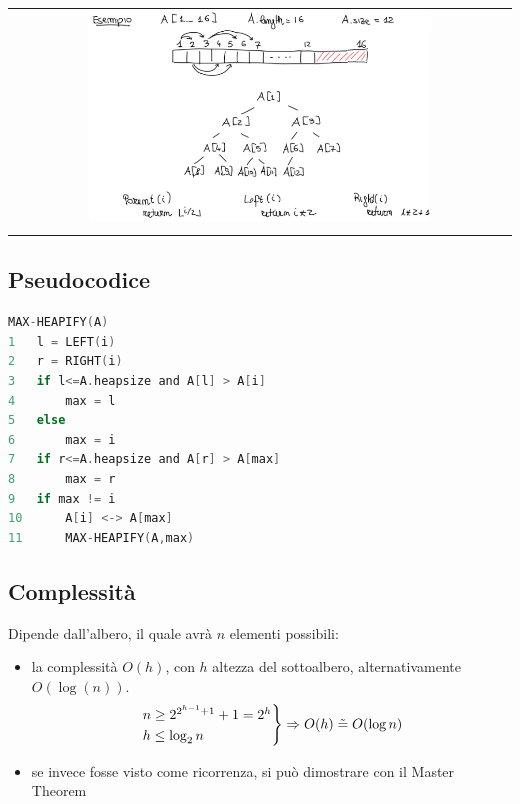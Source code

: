 \begin{center}
    \begin{tabular}{c}
        \\ \includegraphics[width=0.7\textwidth]{image/HeapSortExample.png} \\ \\
    \end{tabular}
\end{center}

\subsection{Pseudocodice}
\begin{mdframed}
\begin{lstlisting}[language=C]
MAX-HEAPIFY(A)
1   l = LEFT(i)
2   r = RIGHT(i)
3   if l<=A.heapsize and A[l] > A[i]
4       max = l
5   else
6       max = i
7   if r<=A.heapsize and A[r] > A[max]
8       max = r
9   if max != i
10      A[i] <-> A[max]
11      MAX-HEAPIFY(A,max)
\end{lstlisting}
\end{mdframed}

\subsection{Complessità}
Dipende dall'albero, il quale avrà $n$ elementi possibili:
\begin{itemize}
    \item la complessità $O(h)$, con $h$ altezza del sottoalbero, alternativamente $O(\log(n))$.
    \begin{equation*}
        \begin{rcases}
            n \geq 2^{2^{h-1}+1} + 1 = 2^h \\
            h \leq \log_2n \\
        \end{rcases}
        \Rightarrow O(h) \;\tilde{=}\; O(\log n)
    \end{equation*}
    \item se invece fosse visto come ricorrenza, si può dimostrare con il Master Theorem
\end{itemize}




\newpage